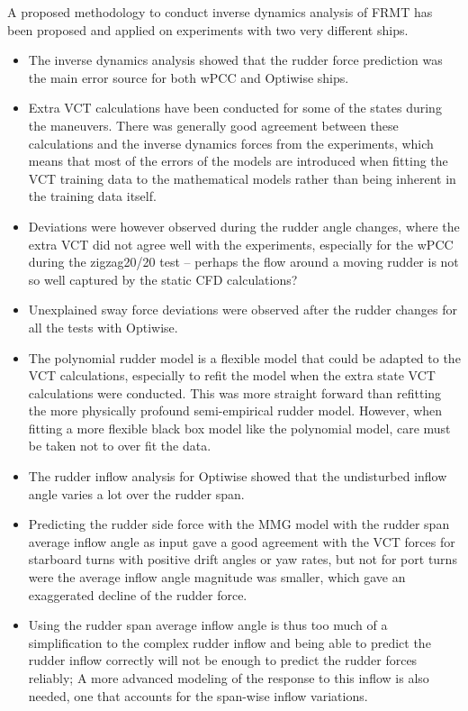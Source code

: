 %
A proposed methodology to conduct inverse dynamics analysis of FRMT has been proposed and applied on experiments with two very different ships.
\begin{itemize}
    \item The inverse dynamics analysis showed that the rudder force prediction
was the main error source for both wPCC and Optiwise ships.
    \item Extra VCT calculations have been conducted for some of the states during the maneuvers. There was generally good agreement between these calculations and the inverse dynamics forces from the experiments, which means that most of the errors of the models are introduced when fitting the VCT training data to the mathematical models rather than being inherent in the training data itself.
    \item Deviations were however observed during the rudder angle changes, where the extra VCT did not agree well with the experiments, especially for the wPCC during the zigzag20/20 test -- perhaps the flow around a moving rudder is not so well captured by the static CFD calculations?
    \item Unexplained sway force deviations were observed after the rudder changes for all the tests with Optiwise.
    \item The polynomial rudder model is a flexible model that could be adapted to the VCT calculations, especially to refit the model when the extra state VCT calculations were conducted. This was more straight forward than refitting the more physically profound semi-empirical rudder model. However, when fitting a more flexible black box model like the polynomial model, care must be taken not to over fit the data.
    \item The rudder inflow analysis for Optiwise showed that the undisturbed inflow angle varies a lot over the rudder span.
    \item Predicting the rudder side force with the MMG model with the rudder span average inflow angle as input gave a good agreement with the VCT forces for starboard turns with positive drift angles or yaw rates, but not for port turns were the average inflow angle magnitude was smaller, which gave an exaggerated decline of the rudder force. 
    \item Using the rudder span average inflow angle is thus too much of a simplification to the complex rudder inflow and being able to predict the rudder inflow correctly will not be enough to predict the rudder forces reliably; A more advanced modeling of the response to this inflow is also needed, one that accounts for the span-wise inflow variations. 
\end{itemize}

